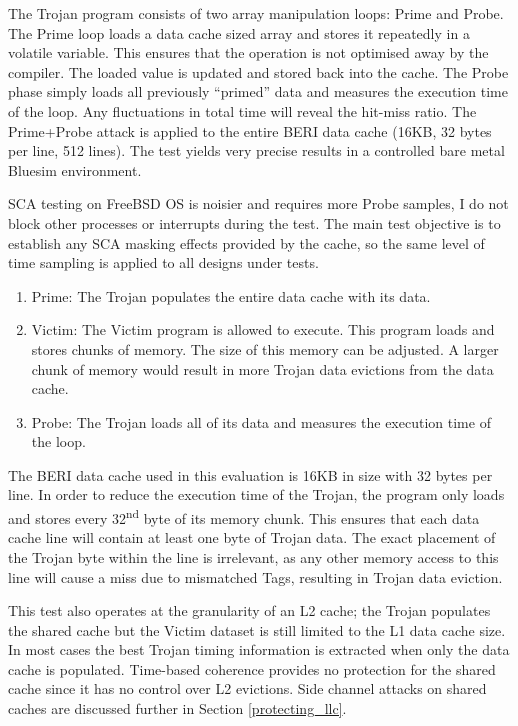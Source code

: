 		The Trojan program consists of two array manipulation loops: Prime and Probe. The Prime loop loads a data cache sized array and stores it repeatedly in a volatile variable. This ensures that the operation is not optimised away by the compiler. The loaded value is updated and stored back into the cache. The Probe phase simply loads all previously ``primed'' data and measures the execution time of the loop. Any fluctuations in total time will reveal the hit-miss ratio. The Prime+Probe attack is applied to the entire BERI data cache (16KB, 32 bytes per line, 512 lines). The test yields very precise results in a controlled bare metal Bluesim environment. 

		SCA testing on FreeBSD OS is noisier and requires more Probe samples, I do not block other processes or interrupts during the test. The main test objective is to establish any SCA masking effects provided by the cache, so the same level of time sampling is applied to all designs under tests.
		
		\begin{enumerate}
			\item Prime: The Trojan populates the entire data cache with its data.
			\item Victim: The Victim program is allowed to execute. This program loads and stores chunks of memory. The size of this memory can be adjusted. A larger chunk of memory would result in more Trojan data evictions from the data cache.
			\item Probe: The Trojan loads all of its data and measures the execution time of the loop.
		\end{enumerate}
		
		The BERI data cache used in this evaluation is 16KB in size with 32 bytes per line. In order to reduce the execution time of the Trojan, the program only loads and stores every 32\textsuperscript{nd} byte of its memory chunk. This ensures that each data cache line will contain at least one byte of Trojan data. The exact placement of the Trojan byte within the line is irrelevant, as any other memory access to this line will cause a miss due to mismatched Tags, resulting in Trojan data eviction.
		
		This test also operates at the granularity of an L2 cache; the Trojan populates the shared cache but the Victim dataset is still limited to the L1 data cache size. In most cases the best Trojan timing information is extracted when only the data cache is populated. Time-based coherence provides no protection for the shared cache since it has no control over L2 evictions. Side channel attacks on shared caches are discussed further in Section \ref{protecting_llc}.
	
